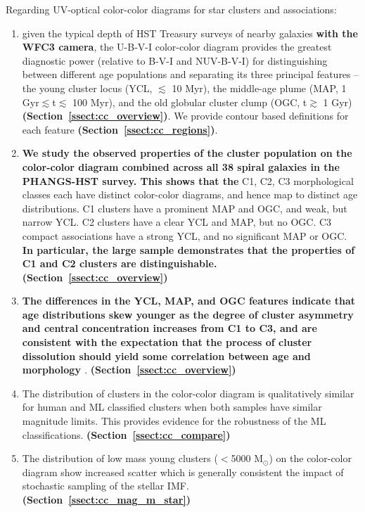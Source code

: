 \documentclass[linenumbers]{aastex63}
\begin{document}
Regarding UV-optical color-color diagrams for star clusters and associations:
\begin{enumerate}  
\item given the typical depth of HST Treasury surveys of nearby galaxies \textbf{with the WFC3 camera}, the U-B-V-I color-color diagram provides the greatest diagnostic power (relative to B-V-I and NUV-B-V-I) for distinguishing between different age populations and separating its three principal features --  the young cluster locus (YCL, $\lesssim$ 10 Myr), the middle-age plume (MAP, 1 Gyr$\lesssim$t$\lesssim$ 100 Myr), and the old globular cluster clump (OGC, t$\gtrsim$ 1 Gyr) \textbf{(Section~\ref{ssect:cc_overview})}.  We provide contour based definitions for each feature \textbf{(Section~\ref{ssect:cc_regions})}.
\item \textbf{We study the observed properties of the cluster population on the color-color diagram combined across all 38 spiral galaxies in the PHANGS-HST survey.  This shows that the} C1, C2, C3 morphological classes each have distinct color-color diagrams, and hence map to distinct age distributions.  C1 clusters have a prominent MAP and OGC, and weak, but narrow YCL.  C2 clusters have a clear YCL and MAP, but no OGC.  C3 compact associations have a strong YCL, and no significant MAP or OGC. \textbf{In particular, the large sample demonstrates that the properties of C1 and C2 clusters are distinguishable. (Section~\ref{ssect:cc_overview})}  
\item \textbf{The differences in the YCL, MAP, and OGC features indicate that age distributions skew younger as the degree of cluster asymmetry and central concentration increases from C1 to C3, and are consistent with the expectation that the process of cluster dissolution should yield some correlation between age and morphology \citep[e.g.,][and references therein]{adamo_legacy_2017, whitmore_star_2021, cook23}}. \textbf{(Section~\ref{ssect:cc_overview})}
\item  The distribution of clusters in the color-color diagram is qualitatively similar for human and ML classified clusters when both samples have similar magnitude limits.  This provides evidence for the robustness of the ML classifications.  \textbf{(Section~\ref{ssect:cc_compare})}
\item The distribution of low mass young clusters ($<$5000 M$_\odot$) on the color-color diagram show increased scatter which is generally consistent the impact of stochastic sampling of the stellar IMF.  \textbf{(Section~\ref{ssect:cc_mag_m_star})}
\end{enumerate}
\end{document}
